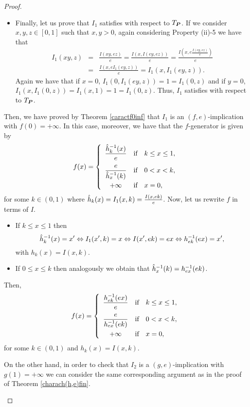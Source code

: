 \begin{proof}
\begin{description}
\begin{itemize}
		\item  Finally, let us prove that $I_1$ satisfies \LIey with respect to $T_{\bm{P}}$. If we consider $x,y,z \in [0,1]$ such that $x,y>0$, again considering Property (ii)-5 we have that
		\begin{eqnarray*}
		I_1(xy,z) &=& \frac{I(xy,ez)}{e} = \frac{I\left(x,I(ey,ez)\right)}{e} = \frac{I\left(x,e\frac{I(ey,ez)}{e}\right)}{e} \\
		&=& \frac{I(x,eI_1(ey,z))}{e} = I_1(x,I_1(ey,z)).
		\end{eqnarray*}
		Again we have that if $x=0$, $I_1(0,I_1(ey,z))=1=I_1(0,z)$ and if $y=0$, $I_1(x,I_1(0,z))=I_1(x,1)=1=I_1(0,z)$. Thus, $I_1$ satisfies \LIey with respect to $T_{\bm{P}}$.
	\end{itemize}
	Then, we have proved by Theorem \ref{caractf0inf} that $I_1$ is an $(f,e)$-implication with $f(0)= +\infty$. In this case, moreover, we have that the $f$-generator is given by
	$$f(x)=\left\{ \begin{array}{ccl}
		\displaystyle \frac{\Hat{h}_k^{-1}(x)}{e} &   \hbox{if}  & k \leq x \leq 1, \\[1em]
		\displaystyle \frac{e}{\Hat{h}_x^{-1}(k)} &  \hbox{if} & 0<x<k, \\[1em]
		+ \infty &  \hbox{if} & x=0, \\
	\end{array}
	\right.
	$$
	for some $k\in(0,1)$ where $\Hat{h}_k(x)=I_1(x,k)=\frac{I(x,ek)}{e}$. Now, let us rewrite $f$ in terms of $I$.
	\begin{itemize}
		\item  If $ k \leq x \leq 1$ then
		$$ \Hat{h}_k^{-1}(x)=x' \Leftrightarrow I_1(x',k)=x \Leftrightarrow I(x',ek)=ex \Leftrightarrow h_{ek}^{-1}(ex)=x',$$
		with $h_k(x)=I(x,k).$
		\item  If $ 0 \leq x \leq k$ then analogously we obtain that $\Hat{h}_x^{-1}(k)=h^{-1}_{ex}(ek)$.
	\end{itemize}
	Then,
	$$f(x)=\left\{ \begin{array}{ccl}
		\displaystyle\frac{h_{ek}^{-1}(ex)}{e} &   \hbox{if}  & k \leq x \leq 1, \\[1em]
		\displaystyle \frac{e}{h_{ex}^{-1}(ek)} &  \hbox{if} & 0<x<k, \\[1em]
		+ \infty &  \hbox{if} & x=0, \\
	\end{array}
	\right.
	$$
	for some $k \in (0,1)$ and $h_k(x)=I(x,k)$.
	
	On the other hand, in order to check that $I_2$ is a $(g,e)$-implication with $g(1)=+\infty$  we can consider the same corresponding argument as in the proof of Theorem \ref{charach(h,e)fin}.
	

\end{description}
\end{proof}
